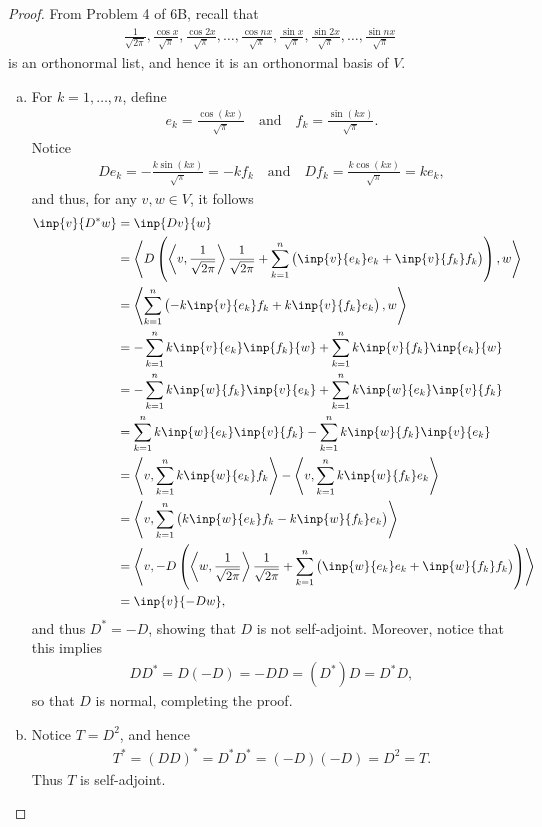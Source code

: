 \documentclass{extarticle}
\begin{document}
\begin{proof}
From Problem 4 of 6B, recall that
\begin{align*}
\frac{1}{\sqrt{2\pi}}, \frac{\cos x}{\sqrt{\pi}}, \frac{\cos 2x}{\sqrt{\pi}}, \dots, \frac{\cos nx}{\sqrt{\pi}}, \frac{\sin x}{\sqrt{\pi}}, \frac{\sin 2x}{\sqrt{\pi}}, \dots, \frac{\sin nx}{\sqrt{\pi}}
\end{align*}
is an orthonormal list, and hence it is an orthonormal basis of $V$.  
\begin{enumerate}[(a)]
\item For $k = 1,\dots, n$, define
\begin{align*}
e_k = \frac{\cos(kx)}{\sqrt{\pi}}\quad\text{and}\quad f_k= \frac{\sin(kx)}{\sqrt{\pi}}.
\end{align*}
Notice
\begin{align*}
De_k = -\frac{k\sin(kx)}{\sqrt{\pi}} = -kf_k\quad\text{and}\quad Df_k = \frac{k\cos(kx)}{\sqrt{\pi}} = ke_k,
\end{align*}
and thus, for any $v,w\in V$, it follows
\begin{align*}
\inp{v}{D^\ast w} &= \inp{Dv}{w}\\
&= \left\langle D\left(\left\langle v, \frac{1}{\sqrt{2\pi}}\right\rangle \frac{1}{\sqrt{2\pi}}+\sum_{k=1}^n\left(\inp{v}{e_k}e_k + \inp{v}{f_k}f_k\right)\right), w\right\rangle\\
&= \left\langle \sum_{k=1}^n\left(-k\inp{v}{e_k}f_k + k\inp{v}{f_k}e_k\right), w\right\rangle\\
&= -\sum_{k = 1}^nk\inp{v}{e_k}\inp{f_k}{w} + \sum_{k = 1}^nk\inp{v}{f_k}\inp{e_k}{w}\\
&= -\sum_{k= 1}^nk\inp{w}{f_k}\inp{v}{e_k} +  \sum_{k = 1}^nk\inp{w}{e_k}\inp{v}{f_k}\\
&= \sum_{k = 1}^nk\inp{w}{e_k}\inp{v}{f_k} - \sum_{k= 1}^nk\inp{w}{f_k}\inp{v}{e_k}\\
&= \left\langle v, \sum_{k=1}^nk\inp{w}{e_k}f_k \right\rangle - \left\langle v, \sum_{k=1}^nk\inp{w}{f_k}e_k \right\rangle\\
&= \left\langle v, \sum_{k=1}^n\left(k\inp{w}{e_k}f_k - k\inp{w}{f_k}e_k \right)\right\rangle\\
&= \left\langle v,  -D\left(\left\langle w, \frac{1}{\sqrt{2\pi}}\right\rangle \frac{1}{\sqrt{2\pi}}+\sum_{k=1}^n\left(\inp{w}{e_k}e_k + \inp{w}{f_k}f_k\right)\right)\right\rangle\\
&= \inp{v}{-Dw},
\end{align*}
and thus $D^\ast = -D$, showing that $D$ is not self-adjoint.  Moreover, notice that this implies
\begin{align*}
DD^\ast = D(-D) = -DD = (D^\ast)D = D^\ast D,
\end{align*}
so that $D$ is normal, completing the proof.

\item Notice $T = D^2$, and hence
\begin{align*} 
T^\ast = (DD)^\ast = D^\ast D^\ast = (-D)(-D) = D^2  = T.
\end{align*}
Thus $T$ is self-adjoint. \qedhere
\end{enumerate}
\end{proof}
\end{document}
